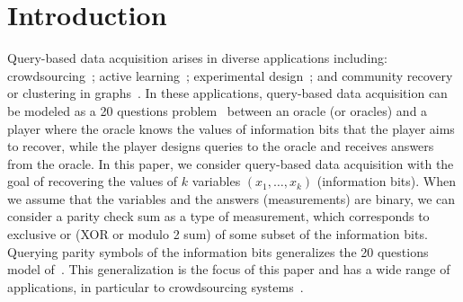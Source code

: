 \documentclass[11pt,onecolumn]{IEEEtran}
\begin{document}




\IEEEpeerreviewmaketitle


\section{Introduction}

Query-based data acquisition arises in diverse applications including: crowdsourcing~\cite{karger2014budget, bernstein2011crowds}; active learning~\cite{mackay1992information,settles2010active}; experimental design~\cite{lindley1956measure,fedorov1972theory}; and community recovery or clustering in graphs~\cite{abbe2015community,hajek2017information}. 
In these applications, query-based data acquisition can be modeled as a 20 questions problem~\cite{chung2017unequal} between an oracle (or oracles) and a player where the oracle knows the values of information bits that the player aims to recover, while the player designs queries to the oracle and receives answers from the oracle.
In this paper, we consider query-based data acquisition with the goal of recovering the values of $k$ variables $(x_1,\dots, x_k)$ (information bits). %
When we assume that the variables and the answers (measurements) are binary, we can consider a parity check sum as a type of measurement, which corresponds to exclusive or (XOR or modulo 2 sum) of some subset of the information bits. 
Querying parity symbols of the information bits generalizes the 20 questions model of~\cite{chung2017unequal,tsiligkaridis2014collaborative}. This generalization is the focus of this paper and has a wide range of applications, in particular to crowdsourcing systems~\cite{karger2014budget}.   
\end{document}
